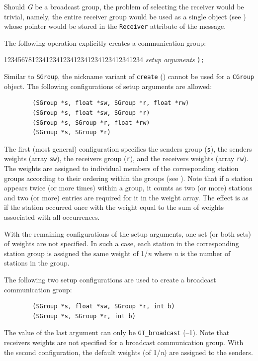 Should {\em G\/} be a broadcast group, the problem of selecting the receiver would
be trivial, namely, the entire receiver group would be used as a single
object (see ) whose pointer would be stored in the
{\tt Receiver} attribute of the message.

The following operation explicitly creates a communication group:
{\tt\begin{tabbing}
12345678\=1234\=1234\=1234\=1234\=1234\=1234\=1234\=1234\kill
{} {\em setup arguments} {\tt );}
\end{tabbing}}
\noindent
Similar to {\tt SGroup}, the nickname variant of {\tt create}
() cannot be used for a {\tt CGroup} object.
The following configurations of setup arguments are allowed:
\begin{verbatim}
        (SGroup *s, float *sw, SGroup *r, float *rw)
        (SGroup *s, float *sw, SGroup *r)
        (SGroup *s, SGroup *r, float *rw)
        (SGroup *s, SGroup *r)
\end{verbatim}

The first (most general) configuration specifies the senders group ({\tt s}),
the senders weights (array {\tt sw}), the receivers group
({\tt r}), and the receivers weights (array {\tt rw}).
The weights are assigned to individual members of the corresponding
station groups according to their ordering within the groups
(see ).
Note that if a station appears twice (or more times)
within a group, it counts as two (or more)
stations and two (or more) entries are required for it in the weight array.
The effect is as if the station occurred once with the weight equal to
the sum of weights associated with all occurrences.

With the remaining configurations of the setup arguments,
one set (or both sets) of weights are not specified.
In such a case, each station in the corresponding station group is assigned
the same weight of 1/{\em n\/} where {\em n\/} is the number of stations in the group.

The following two setup
configurations are used to create a broadcast communication group:
\begin{verbatim}
        (SGroup *s, float *sw, SGroup *r, int b)
        (SGroup *s, SGroup *r, int b)
\end{verbatim}
The value of the last argument can only be {\tt GT\_broadcast} (--1).
Note that receivers weights are not specified for a broadcast communication
group.
With the second configuration, the default weights (of 1/{\em n\/})
are assigned to the senders.

